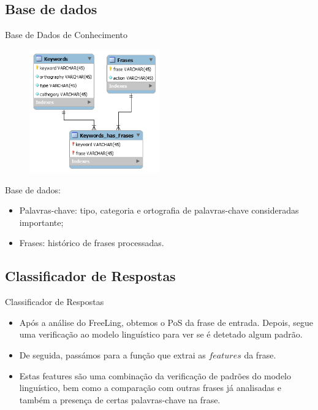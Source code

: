 \documentclass{beamer}
\begin{document}
\subsection{Base de dados}

\begin{frame}{Base de Dados de Conhecimento}

\begin{figure}
\includegraphics[width=0.5\textwidth]{modelo}
\end{figure}

Base de dados:
\begin{itemize}
\item Palavras-chave: tipo, categoria e ortografia de palavras-chave consideradas importante;\\
\item Frases: histórico de frases processadas.
\end{itemize}


\end{frame}


\subsection{Classificador de Respostas}
\begin{frame}{Classificador de Respostas}

\begin{itemize}
\item Após a análise do FreeLing, obtemos o PoS da frase de entrada. Depois, segue uma verificação ao modelo linguístico para ver se é detetado algum padrão. \vspace{2mm}

\item De seguida, passámos para a função que extrai as $features$ da frase. \vspace{2mm}

\item Estas features são uma combinação da verificação de padrões do modelo linguístico, bem como a comparação com outras frases já analisadas e também a presença de certas palavras-chave na frase.
\end{itemize}

\end{frame}
\end{document}
